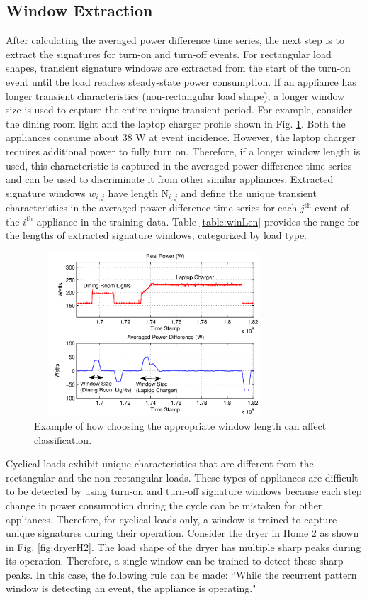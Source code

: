 \documentclass[conference]{IEEEtran}
\begin{document}
\subsection{Window Extraction}
After calculating the averaged power difference time series, the next step is to extract the signatures for turn-on  and turn-off events.  For rectangular load shapes, transient signature windows are extracted from the start of the turn-on event until the load reaches steady-state power consumption.  If an appliance has longer transient characteristics (non-rectangular load shape), a longer window size is used to capture the entire unique transient period.  For example, consider the dining room light and the laptop charger profile shown in Fig. \ref{fig:windowlength}.  Both the appliances consume about 38 W at event incidence.  However, the laptop charger requires additional power to fully turn on.  Therefore, if a longer window length is used, this characteristic is captured in the averaged power difference time series and can be used to discriminate it from other similar appliances. Extracted signature windows $w_{i,j}$ have length $\text{N}_{i,j}$ and define the unique transient characteristics in the averaged power difference time series for each $j^{\text{th}}$ event of the $i^{\text{th}}$ appliance in the training data.  Table \ref{table:winLen} provides the range for the lengths of extracted signature windows, categorized by load type.

\begin{figure}[!t]
	\centering
	\includegraphics[height = 2.4in, width=3.5in]{fig/windowlength.eps}
	\caption{Example of how choosing the appropriate window length can affect classification.}
	\label{fig:windowlength}
\end{figure}

Cyclical loads exhibit unique characteristics that are different from the rectangular and the non-rectangular loads.  These types of appliances are difficult to be detected by using turn-on and turn-off signature windows because each step change in power consumption during the cycle can be mistaken for other appliances.  Therefore, for cyclical loads only, a window is trained to capture unique signatures during their operation.  Consider the dryer in Home 2 as shown in Fig. \ref{fig:dryerH2}.  The load shape of the dryer has multiple sharp peaks during its operation.  Therefore, a single window can be trained to detect these sharp peaks.  In this case, the following rule can be made:  ``While the recurrent pattern window is detecting an event, the appliance is operating."  
\end{document}
